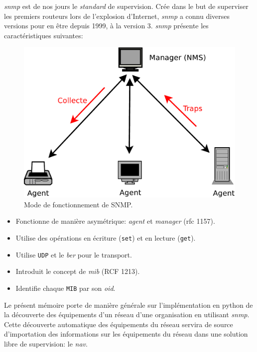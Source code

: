 \emph{\gls*{snmp}} est de nos jours le \emph{standard} de supervision. Crée dans le but de superviser les premiers routeurs lors de l'explosion d'Internet, \emph{\gls*{snmp}} a connu diverses versions pour en être depuis 1999, à la version 3. \emph{\gls*{snmp}} présente les caractéristiques suivantes:
\begin{figure}[H]
    \begin{center}
     \includegraphics[scale=0.4]{images/snmp_principe.pdf}
     \caption{Mode de fonctionnement de SNMP. \label {fig:snmp}} 
    \end{center}
   \end{figure} 

\begin{itemize}
\item Fonctionne de manière asymétrique:  \emph{\gls*{agent}} et  \emph{\gls*{manager}} (\gls*{rfc} 1157).
\item Utilise des opérations en écriture (\texttt{set}) et en lecture (\texttt{get}).
\item Utilise \texttt{UDP} et le  \emph{\gls*{ber}} pour le transport.
\item Introduit le concept de  \emph{\gls*{mib}} (RCF 1213).
\item Identifie chaque \texttt{MIB} par son  \emph{\gls*{oid}}. 
\end{itemize}



Le présent mémoire porte  de manière générale sur l'implémentation en python de la découverte des équipements d'un réseau d'une organisation en utilisant \emph{\gls*{snmp}}. Cette découverte automatique des équipements du réseau servira de source d'importation des informations sur les équipements du réseau dans une solution libre de supervision: le \emph{\gls*{nav}}.

